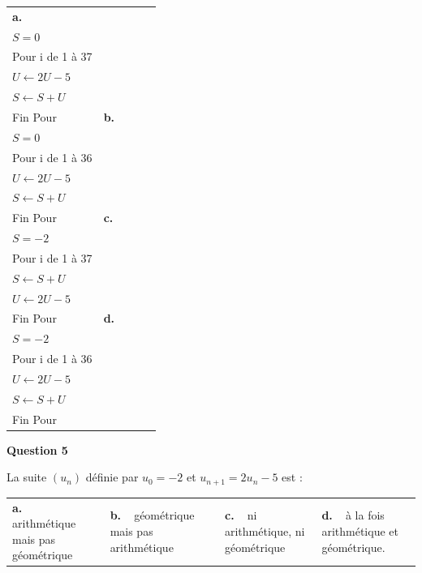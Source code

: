 \vspace{0.5cm}
\begin{tabularx}{\linewidth}{*{4}{X}}

\textbf{a.~~} 
\begin{minipage}[t]{2.9cm}
$U=-2$\\
$S=0$\\
Pour i de 1 à 37\\
$U \leftarrow 2U-5$\\
$S\leftarrow  S+U$\\
Fin Pour 
\end{minipage}
&

\textbf{b.~~}
 \begin{minipage}[t]{2.9cm}
$U=-2$\\
$S=0$\\
Pour i de 1 à 36\\
$U \leftarrow 2U-5$\\
$S \leftarrow  S+U$\\
Fin Pour
\end{minipage}
&

\textbf{c.~~}
 \begin{minipage}[t]{2.9cm}
$U=-2$\\
$S=-2$\\
Pour i de 1 à 37\\
$S \leftarrow  S+U$\\
$U \leftarrow 2U-5$\\
Fin Pour
\end{minipage}
&

\textbf{d.~~} 
\begin{minipage}[t]{2.9cm}
$U=-2$\\
$S=-2$\\
Pour i de 1 à 36\\
$U\leftarrow 2U-5$\\
$S \leftarrow S+U$\\
Fin Pour
\end{minipage}

\end{tabularx}

\medskip

\textbf{Question 5}

\medskip 


La suite $\left(u_n\right)$ définie par $u_0 =-2$ et $u_{n+1} = 2u_n - 5$ est :

\begin{center}
\begin{tabularx}{\linewidth}{*{4}{X}}
\textbf{a.~~} arithmétique mais pas géométrique &\textbf{b.~~}géométrique mais pas arithmétique &\textbf{c.~~}ni arithmétique, ni géométrique& \textbf{d.~~}à la fois arithmétique et géométrique.
\end{tabularx}
\end{center}

\vspace{0,5cm}
